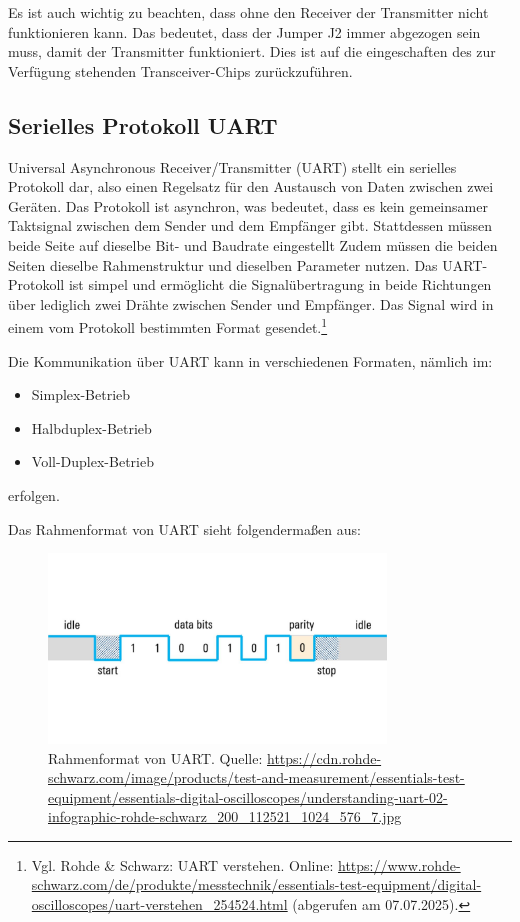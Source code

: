 Es ist auch wichtig zu beachten, dass ohne den Receiver der Transmitter nicht funktionieren kann. Das bedeutet, dass der Jumper J2 immer abgezogen sein muss, damit der Transmitter funktioniert. Dies ist auf die eingeschaften des zur Verfügung stehenden Transceiver-Chips zurückzuführen.

\subsection{Serielles Protokoll UART}
Universal Asynchronous Receiver/Transmitter (UART) stellt ein serielles Protokoll dar, also einen Regelsatz für den Austausch von Daten zwischen zwei Geräten. Das Protokoll ist asynchron, was bedeutet, dass es kein gemeinsamer Taktsignal zwischen dem Sender und dem Empfänger gibt. Stattdessen müssen beide Seite auf dieselbe Bit- und Baudrate eingestellt
Zudem müssen die beiden Seiten dieselbe Rahmenstruktur und dieselben Parameter nutzen. Das UART-Protokoll ist simpel und ermöglicht die Signalübertragung in beide Richtungen über lediglich zwei Drähte zwischen Sender und Empfänger. Das Signal wird in einem vom Protokoll bestimmten Format gesendet.\footnote{Vgl. Rohde \& Schwarz: UART verstehen. Online: \url{https://www.rohde-schwarz.com/de/produkte/messtechnik/essentials-test-equipment/digital-oscilloscopes/uart-verstehen_254524.html} (abgerufen am 07.07.2025).} 

Die Kommunikation über UART kann in verschiedenen Formaten, nämlich im:
\begin{itemize}
    \item Simplex-Betrieb
    \item Halbduplex-Betrieb
    \item Voll-Duplex-Betrieb
\end{itemize}
erfolgen.

Das Rahmenformat von UART sieht folgendermaßen aus:
\begin{figure}[H]
    \centering
    \includegraphics[width=0.8\textwidth]{Pictures/UART-Frame.jpg}
    \caption{Rahmenformat von UART. Quelle: \url{https://cdn.rohde-schwarz.com/image/products/test-and-measurement/essentials-test-equipment/essentials-digital-oscilloscopes/understanding-uart-02-infographic-rohde-schwarz_200_112521_1024_576_7.jpg}}
    \label{fig:UART-Frame}
\end{figure}

